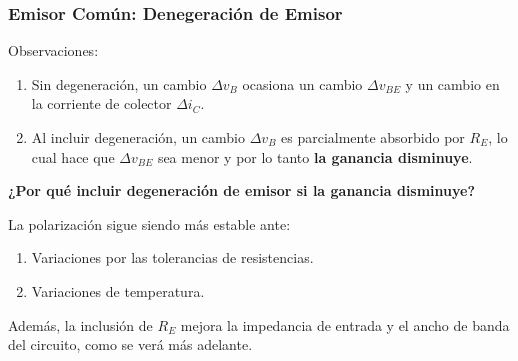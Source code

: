 \begin{frame}[t]
    \frametitle{Emisor Común: Denegeración de Emisor}

    Observaciones:

    \begin{enumerate}
        \item Sin degeneración, un cambio $\Delta v_B$ ocasiona un cambio $\Delta v_{BE}$ y un cambio en la corriente de colector $\Delta i_C$.
        \item Al incluir degeneración, un cambio $\Delta v_B$ es parcialmente absorbido por $R_E$, lo cual hace que $\Delta v_{BE}$ sea menor y por lo tanto \textbf{la ganancia disminuye}.
    \end{enumerate}

    \vspace{5mm}
    \textbf{¿Por qué incluir degeneración de emisor si la ganancia disminuye?}

    \vspace{5mm}
    La polarización sigue siendo más estable ante:

    \begin{enumerate}
        \item Variaciones por las tolerancias de resistencias.
        \item Variaciones de temperatura.
    \end{enumerate}

    \vspace{5mm}
    Además, la inclusión de $R_E$ mejora la impedancia de entrada y el ancho de banda del circuito, como se verá más adelante.
\end{frame}

